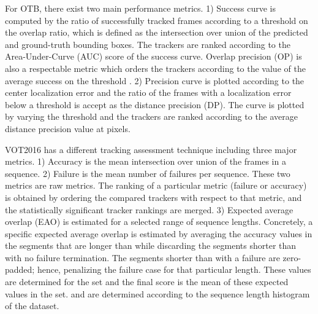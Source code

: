 \documentclass[journal]{IEEEtran}
\begin{document}
For OTB, there exist two main performance metrics. 1) Success curve is computed by the ratio of successfully tracked frames according to a threshold on the overlap ratio, which is defined as the intersection over union of the predicted and ground-truth bounding boxes. The trackers are ranked according to the Area-Under-Curve (AUC) score of the success curve. Overlap precision (OP) is also a respectable metric which orders the trackers according to the value of the average success on the threshold . 2) Precision curve is plotted according to the center localization error and the ratio of the frames with a localization error below a threshold is accept as the distance precision (DP). The curve is plotted by varying the threshold and the trackers are ranked according to the average distance precision value at  pixels.

VOT2016 has a different tracking assessment technique including three major metrics. 1) Accuracy is the mean intersection over union of the frames in a sequence. 2) Failure is the mean number of failures per sequence. These two metrics are raw metrics. The ranking of a particular metric (failure or accuracy) is obtained by ordering the compared trackers with respect to that metric, and the statistically significant tracker rankings are merged. 3) Expected average overlap (EAO) is estimated for a selected range of sequence lengths. Concretely, a specific expected average overlap  is estimated by averaging the accuracy values in the segments that are longer than  while discarding the segments shorter than  with no failure termination. The segments shorter than  with a failure are zero-padded; hence, penalizing the failure case for that particular  length. These  values are determined for the set  and the final score is the mean of these expected values in the set.  and  are determined according to the sequence length histogram of the dataset.
\end{document}

